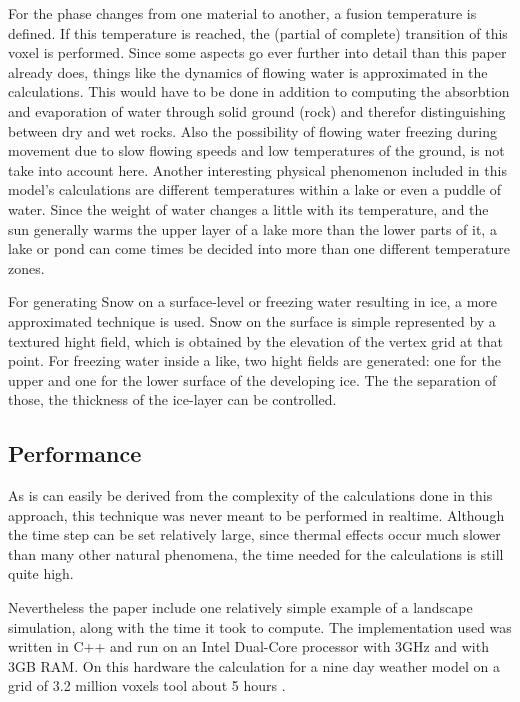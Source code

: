 For the phase changes from one material to another, a fusion temperature is defined. If this temperature is reached, the (partial of complete) transition of this voxel is performed. Since some aspects go ever further into detail than this paper already does, things like the dynamics of flowing water is approximated in the calculations. This would have to be done in addition to computing the absorbtion and evaporation of water through solid ground (rock) and therefor distinguishing between dry and wet rocks. Also the possibility of flowing water freezing during movement due to slow flowing speeds and low temperatures of the ground, is not take into account here. Another interesting physical phenomenon included in this model's calculations are different temperatures within a lake or even a puddle of water. Since the weight of water changes a little with its temperature, and the sun generally warms the upper layer of a lake more than the lower parts of it, a lake or pond can come times be decided into more than one different temperature zones.

For generating Snow on a surface-level or freezing water resulting in ice, a more approximated technique is used. Snow on the surface is simple represented by a textured hight field, which is obtained by the elevation of the vertex grid at that point. For freezing water inside a like, two hight fields are generated: one for the upper and one for the lower surface of the developing ice. The the separation of those, the thickness of the ice-layer can be controlled.

\subsection{Performance}
As is can easily be derived from the complexity of the calculations done in this approach, this technique was never meant to be performed in realtime. Although the time step can be set relatively large, since thermal effects occur much slower than many other natural phenomena, the time needed for the calculations is still quite high.

Nevertheless the paper include one relatively simple example of a landscape simulation, along with the time it took to compute. The implementation used was written in C++ and run on an Intel Dual-Core processor with 3GHz and with 3GB RAM. On this hardware the calculation for a nine day weather model on a grid of 3.2 million voxels tool about 5 hours \cite{benes2001layered}.